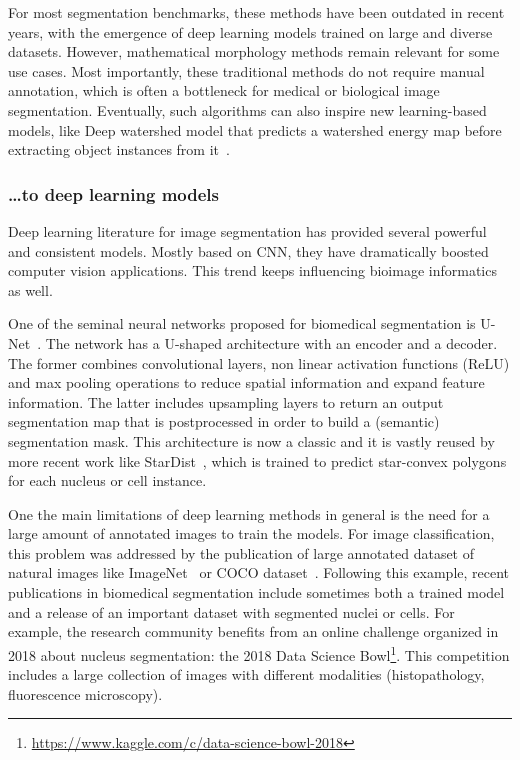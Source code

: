 For most segmentation benchmarks, these methods have been outdated in recent years, with the emergence of deep learning models trained on large and diverse datasets.
However, mathematical morphology methods remain relevant for some use cases.
Most importantly, these traditional methods do not require manual annotation, which is often a bottleneck for medical or biological image segmentation.
Eventually, such algorithms can also inspire new learning-based models, like Deep watershed model that predicts a watershed energy map before extracting object instances from it~\cite{Bai_2017_CVPR}.

\subsubsection{\dots to deep learning models}

Deep learning literature for image segmentation has provided several powerful and consistent models.
Mostly based on \ac{CNN}, they have dramatically boosted computer vision applications.
This trend keeps influencing bioimage informatics as well.

One of the seminal neural networks proposed for biomedical segmentation is U-Net~\cite{Ronneberger_2015}.
The network has a U-shaped architecture with an encoder and a decoder.
The former combines convolutional layers, non linear activation functions (ReLU) and max pooling operations to reduce spatial information and expand feature information.
The latter includes upsampling layers to return an output segmentation map that is postprocessed in order to build a (semantic) segmentation mask.
This architecture is now a classic and it is vastly reused by more recent work like StarDist~\cite{schmidt2018}, which is trained to predict star-convex polygons for each nucleus or cell instance.

One the main limitations of deep learning methods in general is the need for a large amount of annotated images to train the models.
For image classification, this problem was addressed by the publication of large annotated dataset of natural images like ImageNet~\cite{Deng_2009} or COCO dataset~\cite{Lin_2014}.
Following this example, recent publications in biomedical segmentation include sometimes both a trained model and a release of an important dataset with segmented nuclei or cells.
For example, the research community benefits from an online challenge organized in 2018 about nucleus segmentation: the 2018 Data Science Bowl\footnote{\url{https://www.kaggle.com/c/data-science-bowl-2018}}.
This competition includes a large collection of images with different modalities (histopathology, fluorescence microscopy).

